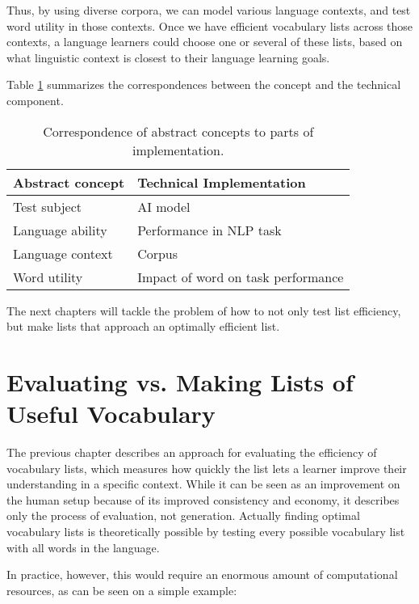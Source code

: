 Thus, by using diverse corpora, we can model various language contexts, and test word utility in those contexts.
Once we have efficient vocabulary lists across those contexts, a language learners could choose one or several of these lists, based on what linguistic context is closest to their language learning goals.


Table \ref{table:concept-implementation-correspondence} summarizes the correspondences between the concept and the technical component.

\begin{table}[ht]
	\centering
	\begin{tabularx}{\textwidth}{|X|X|}
		\hline
		\textbf{Abstract concept} & \textbf{Technical Implementation}  \\
		\hline
		Test subject              & AI model                           \\
		\hline
		Language ability          & Performance in NLP task            \\
		\hline
		Language context          & Corpus                             \\
		\hline
		Word utility              & Impact of word on task performance \\
		\hline
	\end{tabularx}
	\caption{Correspondence of abstract concepts to parts of implementation.}
	\label{table:concept-implementation-correspondence}
\end{table}

The next chapters will tackle the problem of how to not only test list efficiency, but make lists that approach an optimally efficient list.

\section{Evaluating vs. Making Lists of Useful Vocabulary} \label{sec:eval-vs-creation}
The previous chapter describes an approach for evaluating the efficiency of vocabulary lists, which measures how quickly the list lets a learner improve their understanding in a specific context.
While it can be seen as an improvement on the human setup because of its improved consistency and economy, it describes only the process of evaluation, not generation.
Actually finding optimal vocabulary lists is theoretically possible by testing every possible vocabulary list with all words in the language.

In practice, however, this would require an enormous amount of computational resources, as can be seen on a simple example:

